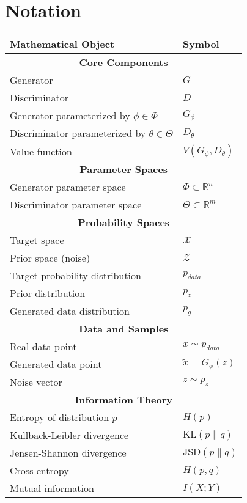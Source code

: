 \section{Notation}
\vspace{1cm}

\begin{center}
\renewcommand{\arraystretch}{1.5}
\begin{tabular}{@{}p{} p{}@{}}
\toprule
\textbf{Mathematical Object} & \textbf{Symbol} \\
\midrule

\multicolumn{2}{c}{\textbf{Core Components}} \\
Generator & $G$ \\
Discriminator & $D$ \\
Generator parameterized by $\phi \in \Phi$ & $G_\phi$ \\
Discriminator parameterized by $\theta \in \Theta$ & $D_\theta$ \\
Value function & $V(G_\phi, D_\theta)$ \\
\midrule

\multicolumn{2}{c}{\textbf{Parameter Spaces}} \\
Generator parameter space & $\Phi \subset \mathbb{R}^n$ \\
Discriminator parameter space & $\Theta \subset \mathbb{R}^m$ \\
\midrule

\multicolumn{2}{c}{\textbf{Probability Spaces}} \\
Target space & $\mathcal{X}$ \\
Prior space (noise) & $\mathcal{Z}$ \\
Target probability distribution & $p_{data}$ \\
Prior distribution & $p_z$ \\
Generated data distribution & $p_g$ \\
\midrule

\multicolumn{2}{c}{\textbf{Data and Samples}} \\
Real data point & $x \sim p_{data}$ \\
Generated data point & $\tilde{x} = G_\phi(z)$ \\
Noise vector & $z \sim p_z$ \\
\midrule

\multicolumn{2}{c}{\textbf{Information Theory}} \\
Entropy of distribution $p$ & $H(p)$ \\
Kullback-Leibler divergence & $\text{KL}(p \| q)$ \\
Jensen-Shannon divergence & $\text{JSD}(p \| q)$ \\
Cross entropy & $H(p, q)$ \\
Mutual information & $I(X; Y)$ \\
\midrule


\end{tabular}
\end{center}
